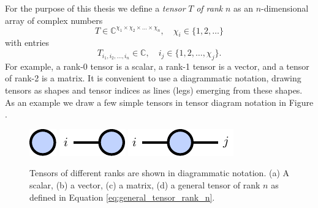 For the purpose of this thesis we define a \textit{tensor} $T$ \textit{of rank} $n$ as an $n$-dimensional array of complex numbers
\begin{equation}
	\label{eq:general_tensor_rank_n}
	T \in \mathbb{C}^{\chi_1\times\chi_2\times\dots\times\chi_n}, \quad \chi_i \in \{1, 2, \dots\}
\end{equation}
with entries
\begin{equation}
	T_{i_1,i_2,\dots,i_n} \in \mathbb{C}, \quad i_j \in \{1, 2, \dots, \chi_j\}.
\end{equation}
For example, a rank-0 tensor is a scalar, a rank-1 tensor is a vector, and a tensor of rank-2 is a matrix. It is convenient to use a diagrammatic notation, drawing tensors as shapes and tensor indices as lines (legs) emerging from these shapes. As an example we draw a few simple tensors in tensor diagram notation in Figure . \par
\begin{figure}[ht]
	\centering
	\subcaptionbox{\label{fig:basic_tensor_diagrams_scalar}}
	{%
		\raisebox{\dimexpr.5\ht\largestimage-.5\height}
		{%
			\includegraphics[scale=1]{figures/tikz/Tensor_Networks/basic_diagrams/basic_diagrams_a.pdf}
		}
	}
	\quad\quad
	\subcaptionbox{\label{fig:basic_tensor_diagrams_vector}}
	{%
		\raisebox{\dimexpr.5\ht\largestimage-.5\height}
		{%
			\includegraphics[scale=1]{figures/tikz/Tensor_Networks/basic_diagrams/basic_diagrams_b.pdf}
		}
	}
	\quad\quad
	\subcaptionbox{\label{fig:basic_tensor_diagrams_matrix}}
	{%
		\raisebox{\dimexpr.5\ht\largestimage-.5\height}
		{%
			\includegraphics[scale=1]{figures/tikz/Tensor_Networks/basic_diagrams/basic_diagrams_c.pdf}
		}
	}
	\quad\quad
	\subcaptionbox{\label{fig:basic_tensor_diagrams_rank_n_tensor}}
	{%
		\usebox{\largestimage}
	}
\caption{Tensors of different ranks are shown in diagrammatic notation. (a) A scalar, (b) a vector, (c) a matrix, (d) a general tensor of rank $n$ as defined in Equation \eqref{eq:general_tensor_rank_n}.}
\label{fig:basic_tensor_diagrams}
\end{figure}
